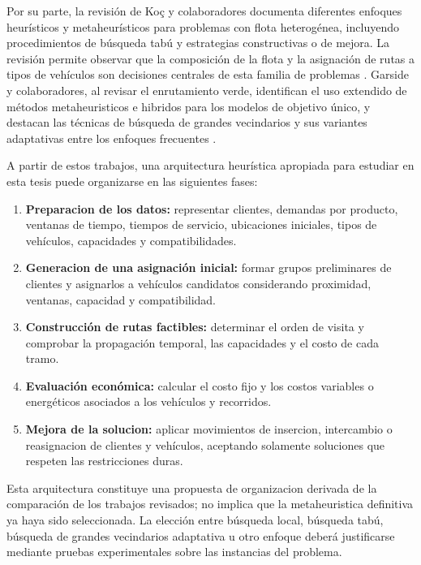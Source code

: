 Por su parte, la revisión de Ko\c{c} y colaboradores documenta diferentes enfoques heurísticos y metaheurísticos para problemas con flota heterogénea, incluyendo procedimientos de búsqueda tabú y estrategias constructivas o de mejora. La revisión permite observar que la composición de la flota y la asignación de rutas a tipos de vehículos son decisiones centrales de esta familia de problemas \cite{koc2016}. Garside y colaboradores, al revisar el enrutamiento verde, identifican el uso extendido de métodos metaheuristicos e hibridos para los modelos de objetivo único, y destacan las técnicas de búsqueda de grandes vecindarios y sus variantes adaptativas entre los enfoques frecuentes \cite{garside2024}.

A partir de estos trabajos, una arquitectura heurística apropiada para estudiar en esta tesis puede organizarse en las siguientes fases:

\begin{enumerate}
    \item \textbf{Preparacion de los datos:} representar clientes, demandas por producto, ventanas de tiempo, tiempos de servicio, ubicaciones iniciales, tipos de vehículos, capacidades y compatibilidades.
    \item \textbf{Generacion de una asignación inicial:} formar grupos preliminares de clientes y asignarlos a vehículos candidatos considerando proximidad, ventanas, capacidad y compatibilidad.
    \item \textbf{Construcción de rutas factibles:} determinar el orden de visita y comprobar la propagación temporal, las capacidades y el costo de cada tramo.
    \item \textbf{Evaluación económica:} calcular el costo fijo y los costos variables o energéticos asociados a los vehículos y recorridos.
    \item \textbf{Mejora de la solucion:} aplicar movimientos de insercion, intercambio o reasignacion de clientes y vehículos, aceptando solamente soluciones que respeten las restricciones duras.
\end{enumerate}

Esta arquitectura constituye una propuesta de organizacion derivada de la comparación de los trabajos revisados; no implica que la metaheuristica definitiva ya haya sido seleccionada. La elección entre búsqueda local, búsqueda tabú, búsqueda de grandes vecindarios adaptativa u otro enfoque deberá justificarse mediante pruebas experimentales sobre las instancias del problema.

